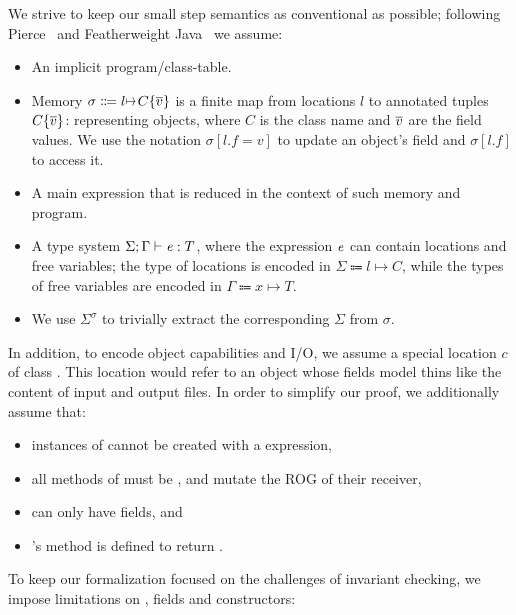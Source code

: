 We strive to keep our small step semantics as conventional as possible; following Pierce~\cite{pierce2002types} and Featherweight Java~\cite{IgarashiEtAl01} we assume:
\begin{itemize}
\item An implicit program/class-table.
\item Memory $\sigma\Coloneqq l\mapsto C\{\Many{v}\}$ is a finite map from locations $l$ to annotated tuples $C\{\hspace{0.03ex} \overline{\hspace{-0.03ex}v\hspace{-0.03ex}} \hspace{0.03ex}\}$: representing objects,
where $C$ is the class name and $\hspace{0.03ex} \overline{\hspace{-0.03ex}v\hspace{-0.03ex}} \hspace{0.03ex}$ are the field values.
We use the notation $\sigma[l.f=v]$ to update an object's field and $\sigma[l.f]$ to access it.
\item A main expression that is reduced in the context of such memory and program.
\item A type system $\Sigma;\Gamma\vdash{\ensuremath{\mathit{e}}}:T$, where 
the expression ${\mathit{e}}$ can contain locations and free variables;
the type of locations is encoded in $\Sigma\Coloneqq l\mapsto C$,
while the types of free variables are encoded in $\Gamma\Coloneqq x\mapsto T$.
\item We use $\Sigma^\sigma$ to trivially extract the corresponding $\Sigma$ from $\sigma$.
\end{itemize}
In addition, to encode object capabilities and I/O, we assume a special location  $c$ of class \Q@Cap@. This location would refer to an object whose fields model thins like the content of input and output files. In order to simplify our proof, we additionally assume that:
\begin{itemize}
	\item instances of \Q@Cap@ cannot be created with a \Q@new@ expression,
	\item all methods of \Q@Cap@ must be \Q@mut@, and mutate the ROG of their receiver,
	\item \Q@Cap@ can only have \Q@mut@ fields, and
	\item \Q@Cap@'s \Q@invariant@ method is defined to return \Q@true@.
\end{itemize}
\noindent
To keep our formalization focused on
the challenges of invariant checking, 
we impose limitations on \Q@this@, fields and constructors:
